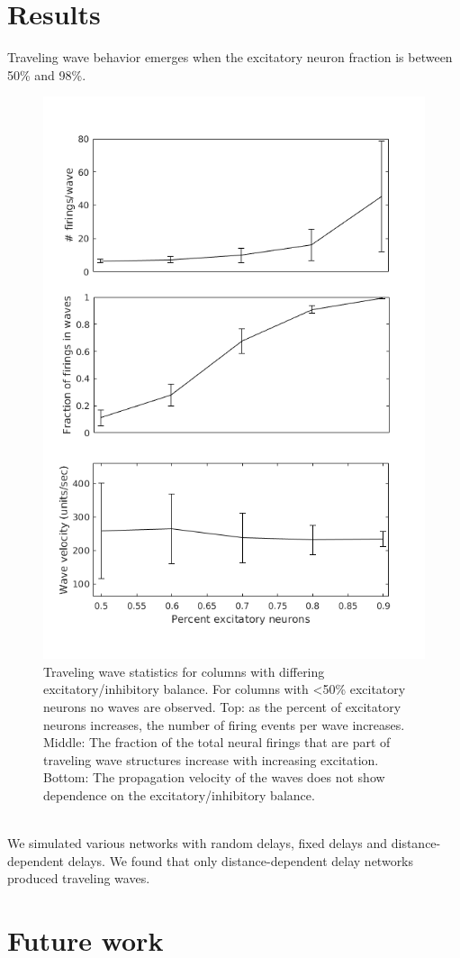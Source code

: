 \documentclass[a4paper,11pt]{article}
\begin{document}
\section{Results}
Traveling wave behavior emerges when the excitatory neuron fraction is between 50\% and 98\%.
\begin{figure}[ht]
 \caption{Traveling wave statistics for columns with differing excitatory/inhibitory balance. 
	  For columns with <50\% excitatory neurons no waves are observed. 
	  Top: as the percent of excitatory neurons increases, the number of firing events per wave increases. 
	  Middle: The fraction of the total neural firings that are part of traveling wave structures increase with increasing excitation.
	  Bottom: The propagation velocity of the waves does not show dependence on the excitatory/inhibitory balance.}
 \label{fig:excitatory_effect}
 \centering
   \includegraphics[width=\textwidth]{fig/ExcitatoryWaves}
\end{figure}
\\
We simulated various networks with random delays, fixed delays and distance-dependent delays.
We found that only distance-dependent delay networks produced traveling waves.


\section{Future work}


\clearpage
\printbibliography
\end{document}
